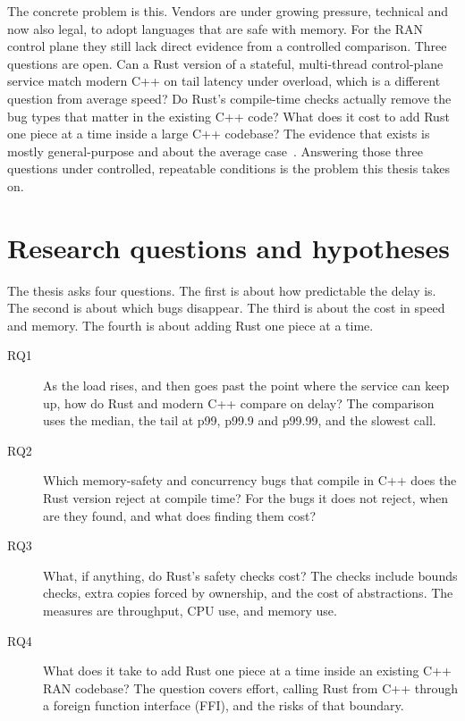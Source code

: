 \documentclass[english,oneside,a4paper,censored,csm,software-track-2020]{HYthesisML}
\begin{document}
The concrete problem is this.
Vendors are under growing pressure, technical and now also legal, to adopt languages that are safe with memory.
For the RAN control plane they still lack direct evidence from a controlled comparison.
Three questions are open.
Can a Rust version of a stateful, multi-thread control-plane service match modern C++ on tail latency under overload, which is a different question from average speed?
Do Rust's compile-time checks actually remove the bug types that matter in the existing C++ code?
What does it cost to add Rust one piece at a time inside a large C++ codebase?
The evidence that exists is mostly general-purpose and about the average case~\cite{balasubramanian2017rust,qin2020rust}.
Answering those three questions under controlled, repeatable conditions is the problem this thesis takes on.

\section{Research questions and hypotheses}\label{sec:rqs}
The thesis asks four questions.
The first is about how predictable the delay is.
The second is about which bugs disappear.
The third is about the cost in speed and memory.
The fourth is about adding Rust one piece at a time.

\begin{description}
  \item[RQ1] As the load rises, and then goes past the point where the service can keep up, how do Rust and modern C++ compare on delay?
        The comparison uses the median, the tail at p99, p99.9 and p99.99, and the slowest call.
  \item[RQ2] Which memory-safety and concurrency bugs that compile in C++ does the Rust version reject at compile time?
        For the bugs it does not reject, when are they found, and what does finding them cost?
  \item[RQ3] What, if anything, do Rust's safety checks cost?
        The checks include bounds checks, extra copies forced by ownership, and the cost of abstractions.
        The measures are throughput, CPU use, and memory use.
  \item[RQ4] What does it take to add Rust one piece at a time inside an existing C++ RAN codebase?
        The question covers effort, calling Rust from C++ through a foreign function interface (FFI), and the risks of that boundary.
\end{description}
\end{document}
